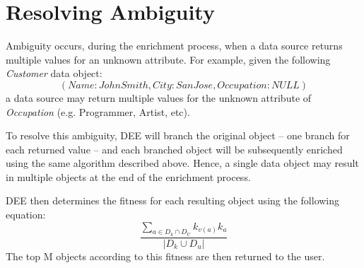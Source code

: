 \documentclass[letterpaper]{article}
\begin{document}
\section{Resolving Ambiguity}

Ambiguity occurs, during the enrichment process, when a data source returns multiple values for an unknown 
attribute. For example, given the following {\it Customer} data object:
\begin{equation}
	(Name: John Smith, City: San Jose, Occupation: NULL)
\end{equation}
a data source may return multiple values for the unknown attribute of {\it Occupation} (e.g. Programmer, 
Artist, etc).

To resolve this ambiguity, DEE will branch the original object -- one branch for each returned value -- 
and each branched object will be subsequently enriched using the same algorithm described above. Hence, 
a single data object may result in multiple objects at the end of the enrichment process. 

DEE then determines the fitness for each resulting object using the following equation:
\begin{equation}
	\frac{\displaystyle\sum\limits_{a \in D_k \cap D_U} k_{v(a)} k_a }{|D_k \cup D_u|}
\end{equation}
The top M objects according to this fitness are then returned to the user.
\end{document}
